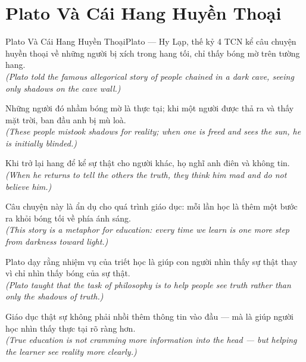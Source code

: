 \section{Plato Và Cái Hang Huyền Thoại}
\begin{truyen}{Plato Và Cái Hang Huyền Thoại}{Plato --- Hy Lạp, thế kỷ 4 TCN}
 kể câu chuyện huyền thoại về những người bị xích trong hang tối, chỉ thấy bóng mờ trên tường hang.\\[4pt]
\textit{(Plato told the famous allegorical story of people chained in a dark cave, seeing only shadows on the cave wall.)}

Những người đó nhầm bóng mờ là thực tại; khi một người được thả ra và thấy mặt trời, ban đầu anh bị mù loà.\\[4pt]
\textit{(These people mistook shadows for reality; when one is freed and sees the sun, he is initially blinded.)}

Khi trở lại hang để kể sự thật cho người khác, họ nghĩ anh điên và không tin.\\[4pt]
\textit{(When he returns to tell the others the truth, they think him mad and do not believe him.)}

Câu chuyện này là ẩn dụ cho quá trình giáo dục: mỗi lần học là thêm một bước ra khỏi bóng tối về phía ánh sáng.\\[4pt]
\textit{(This story is a metaphor for education: every time we learn is one more step from darkness toward light.)}

Plato dạy rằng nhiệm vụ của triết học là giúp con người nhìn thấy sự thật thay vì chỉ nhìn thấy bóng của sự thật.\\[4pt]
\textit{(Plato taught that the task of philosophy is to help people see truth rather than only the shadows of truth.)}

\end{truyen}
\begin{baihoc}
  Giáo dục thật sự không phải nhồi thêm thông tin vào đầu --- mà là giúp người học nhìn thấy thực tại rõ ràng hơn.\\[4pt]
  \textit{(True education is not cramming more information into the head --- but helping the learner see reality more clearly.)}
\end{baihoc}

